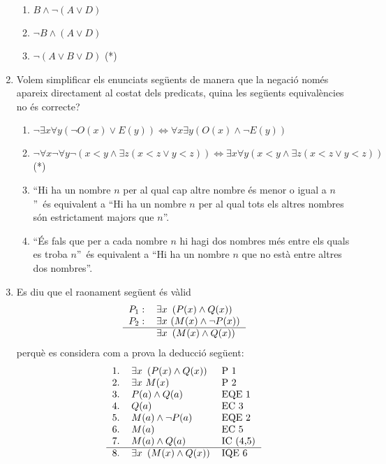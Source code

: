 \begin{enumerate}
\begin{enumerate}
\item $B\wedge\lnot\left(  A\vee D\right)  $

\item $\lnot B\wedge\left(  A\vee D\right)  $

\item $\lnot\left(  A\vee B\vee D\right)  $ (*)
\end{enumerate}

\item Volem simplificar els enunciats seg\"{u}ents de manera que la
negaci\'{o} nom\'{e}s apareix directament al costat dels predicats, quina les
seg\"{u}ents equival\`{e}ncies no \'{e}s correcte?

\begin{enumerate}
\item $\lnot\exists x\forall y(\lnot O(x)\vee E(y))\Longleftrightarrow\forall
x\exists y(O(x)\wedge\lnot E(y))$

\item $\lnot\forall x\lnot\forall y\lnot(x<y\wedge\exists z(x<z\vee
y<z))\Longleftrightarrow\exists x\forall y(x<y\wedge\exists z(x<z\vee y<z)) $ (*)

\item \textquotedblleft Hi ha un nombre $n$ per al qual cap altre nombre
\'{e}s menor o igual a $n$\textquotedblright\ \'{e}s equivalent a
\textquotedblleft Hi ha un nombre $n$ per al qual tots els altres nombres
s\'{o}n estrictament majors que $n$\textquotedblright.

\item \textquotedblleft\'{E}s fals que per a cada nombre $n$ hi hagi dos
nombres m\'{e}s entre els quals es troba $n$\textquotedblright\ \'{e}s
equivalent a \textquotedblleft Hi ha un nombre $n$ que no est\`{a} entre
altres dos nombres\textquotedblright.
\end{enumerate}

\item Es diu que el raonament seg\"{u}ent \'{e}s v\`{a}lid%
\[%
\begin{tabular}
[c]{ll}%
$P_{1}:$ & $\exists x~\left(  P(x)\wedge Q(x)\right)  $\\
$P_{2}:$ & $\exists x$ $\left(  M(x)\wedge\lnot P(x)\right)  $\\\hline
& $\exists x~\left(  M(x)\wedge Q(x)\right)  $%
\end{tabular}
\]
perqu\`{e} es considera com a prova la deducci\'{o} seg\"{u}ent:%
\[%
\begin{tabular}
[c]{lll}%
1. & $\exists x~\left(  P(x)\wedge Q(x)\right)  $ & P 1\\
2. & $\exists x$ $M(x)$ & P 2\\
3. & $P(a)\wedge Q(a)$ & EQE 1\\
4. & $Q(a)$ & EC 3\\
5. & $M(a)\wedge\lnot P(a)$ & EQE 2\\
6. & $M(a)$ & EC 5\\
7. & $M(a)\wedge Q(a)$ & IC (4,5)\\\hline
8. & $\exists x~\left(  M(x)\wedge Q(x)\right)  $ & IQE 6
\end{tabular}
\]



\end{enumerate}
